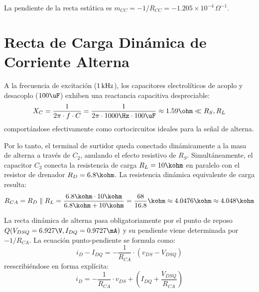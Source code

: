 La pendiente de la recta estática es $m_{CC} = -1/R_{CC} = -1.205 \times 10^{-4}\,\Omega^{-1}$.

\section{Recta de Carga Dinámica de Corriente Alterna}

A la frecuencia de excitación ($1\,\mathrm{kHz}$), los capacitores electrolíticos de acoplo y desacoplo ($100\uF$) exhiben una
reactancia capacitiva despreciable:
\begin{equation}
  X_C = \frac{1}{2\pi \cdot f \cdot C} = \frac{1}{2\pi \cdot 1000\Hz \cdot 100\uF} \approx 1.59\ohm \ll R_S, R_L
\end{equation}
comportándose efectivamente como cortocircuitos ideales para la señal de alterna.

Por lo tanto, el terminal de surtidor queda conectado dinámicamente a la masa de alterna a través de $C_2$, anulando
el efecto resistivo de $R_S$. Simultáneamente, el capacitor $C_3$ conecta la resistencia de carga $R_L = 10\kohm$ en
paralelo con el resistor de drenador $R_D = 6.8\kohm$. La resistencia dinámica equivalente de carga resulta:
\begin{equation}
  R_{CA} = R_D \parallel R_L = \frac{6.8\kohm \cdot 10\kohm}{6.8\kohm + 10\kohm} = \frac{68}{16.8}\kohm \approx 4.0476\kohm \approx 4.048\kohm
  \label{eq:Rca_tp5}
\end{equation}

La recta dinámica de alterna pasa obligatoriamente por el punto de reposo $Q(V_{DSQ} = 6.927\V, I_{DQ} = 0.9727\mA)$
y su pendiente viene determinada por $-1/R_{CA}$. La ecuación punto-pendiente se formula como:
\begin{equation}
  i_D - I_{DQ} = -\frac{1}{R_{CA}} \cdot (v_{DS} - V_{DSQ})
\end{equation}
reescribiéndose en forma explícita:
\begin{equation}
  i_D = -\frac{1}{R_{CA}} \cdot v_{DS} + \left(I_{DQ} + \frac{V_{DSQ}}{R_{CA}}\right)
  \label{eq:recta_ca_tp5}
\end{equation}

